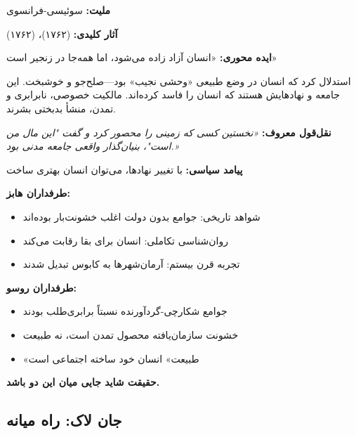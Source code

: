 \begin{personbox}
	
	\textbf{ملیت:} سوئیسی-فرانسوی
	
	\textbf{آثار کلیدی:}  (۱۷۶۲)،  (۱۷۶۲)
	
	\textbf{ایده محوری:} «انسان آزاد زاده می‌شود، اما همه‌جا در زنجیر است»
	
	\mediumspace
	
	 استدلال کرد که انسان در وضع طبیعی «وحشی نجیب» بود—صلح‌جو و خوشبخت. این جامعه و نهادهایش هستند که انسان را فاسد کرده‌اند. مالکیت خصوصی، نابرابری و تمدن، منشأ بدبختی بشرند.
	
	\mediumspace
	
	\textbf{نقل‌قول معروف:} \textit{«نخستین کسی که زمینی را محصور کرد و گفت "این مال من است"، بنیان‌گذار واقعی جامعه مدنی بود.»}
	
	\mediumspace
	
	\textbf{پیامد سیاسی:} با تغییر نهادها، می‌توان انسان بهتری ساخت
\end{personbox}



\vspace{5pt}

\begin{debatebox}
	\textbf{طرفداران هابز:}
	\begin{itemize}[nosep]
		\item شواهد تاریخی: جوامع بدون دولت اغلب خشونت‌بار بوده‌اند
		\item روان‌شناسی تکاملی: انسان برای بقا رقابت می‌کند
		\item تجربه قرن بیستم: آرمان‌شهرها به کابوس تبدیل شدند
	\end{itemize}
	
	\textbf{طرفداران روسو:}
	\begin{itemize}[nosep]
		\item جوامع شکارچی-گردآورنده نسبتاً برابری‌طلب بودند
		\item خشونت سازمان‌یافته محصول تمدن است، نه طبیعت
		\item «طبیعت» انسان خود ساخته اجتماعی است
	\end{itemize}
	
	\textbf{حقیقت شاید جایی میان این دو باشد.}
\end{debatebox}

\subsection{جان لاک: راه میانه}

